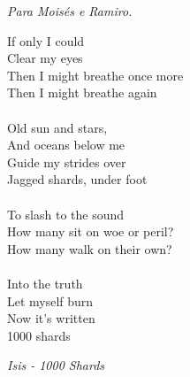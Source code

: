 \documentclass[11pt,twoside]{report}
\begin{document}
\newpage

\vspace*{0.75\textheight}
\begin{flushright}
  \emph{Para Moisés e Ramiro.}
\end{flushright}

\newpage

\vspace*{0.2\textheight}
{\noindent 
If only I could \\
Clear my eyes \\
Then I might breathe once more \\
Then I might breathe again \\
\vspace{0.2 cm} \\
Old sun and stars, \\
And oceans below me \\
Guide my strides over \\
Jagged shards, under foot \\
\vspace{0.2 cm} \\
To slash to the sound \\
How many sit on woe or peril? \\
How many walk on their own? \\
\vspace{0.2 cm} \\
Into the truth \\
Let myself burn \\
Now it's written \\
1000 shards \\
}
\begin{flushright}
\emph {Isis - 1000 Shards}
\end{flushright}

\newpage




%   
\end{document}
